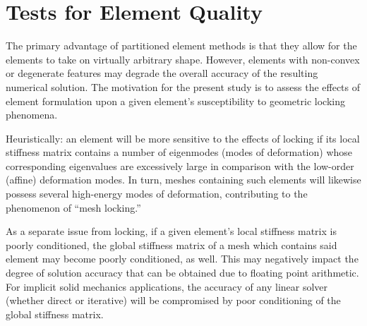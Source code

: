 
\section{Tests for Element Quality}

The primary advantage of partitioned element methods is that they allow for the elements to take on virtually arbitrary shape. However, elements with non-convex or degenerate features may degrade the overall accuracy of the resulting numerical solution. The motivation for the present study is to assess the effects of element formulation upon a given element's susceptibility to geometric locking phenomena.

Heuristically: an element will be more sensitive to the effects of locking if its local stiffness matrix contains a number of eigenmodes (modes of deformation) whose corresponding eigenvalues are excessively large in comparison with the low-order (affine) deformation modes. In turn, meshes containing such elements will likewise possess several high-energy modes of deformation, contributing to the phenomenon of ``mesh locking.''

As a separate issue from locking, if a given element's local stiffness matrix is poorly conditioned, the global stiffness matrix of a mesh which contains said element may become poorly conditioned, as well. This may negatively impact the degree of solution accuracy that can be obtained due to floating point arithmetic. For implicit solid mechanics applications, the accuracy of any linear solver (whether direct or iterative) will be compromised by poor conditioning of the global stiffness matrix.

